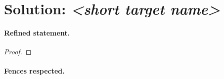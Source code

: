 \documentclass[../main.tex]{subfiles}
\begin{document}

\section*{Solution: \textit{<short target name>}}
\label{sec:sol-{{FILE_ID}}}

\paragraph{Refined statement.}

\begin{theorem}
\label{thm:sol-{{FILE_ID}}}
\end{theorem}

\begin{proof}
\end{proof}

\paragraph{Fences respected.}

\end{document}
